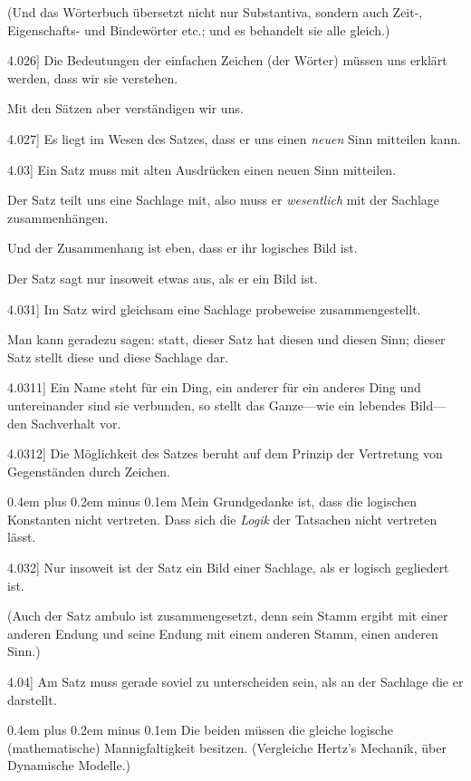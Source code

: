 \documentclass[12pt,oneside]{book}[2007/10/19]
\newcommand{\PropERef}[1]{\hyperref[PropE:#1]{#1}}
\newcommand{\PropositionG}[2]{%
  \item[\phantomsection\label{PropG:#1}\PropERef{#1}] #2%
}
\newcommand{\Emph}[1]{\emph{#1}}%
\newcommand{\stretchyspace}{\spaceskip0.4em plus 0.2em minus 0.1em}
\begin{document}
\begin{propositions}
{(Und das Wörterbuch übersetzt nicht nur
Substantiva, sondern auch \mbox{Zeit-,} Eigenschafts- und
Bindewörter etc.; und es behandelt sie alle gleich.)}


\PropositionG{4.026}
{Die Bedeutungen der einfachen Zeichen (der
Wörter) müssen uns erklärt werden, dass wir sie
verstehen.

Mit den Sätzen aber verständigen wir uns.}


\PropositionG{4.027}
{Es liegt im Wesen des Satzes, dass er uns einen
\Emph{neuen} Sinn mitteilen kann.}


\PropositionG{4.03}
{Ein Satz muss mit alten Ausdrücken einen
neuen Sinn mitteilen.

Der Satz teilt uns eine Sachlage mit, also
muss er \Emph{wesentlich} mit der Sachlage zusammenhängen.

Und der Zusammenhang ist eben, dass er ihr
logisches Bild ist.

Der Satz sagt nur insoweit etwas aus, als er ein
Bild ist.}


\PropositionG{4.031}
{Im Satz wird gleichsam eine Sachlage probeweise
zusammengestellt.

Man kann geradezu sagen: statt, dieser Satz
hat diesen und diesen Sinn; dieser Satz stellt diese
und diese Sachlage dar.}


\PropositionG{4.0311}
{Ein Name steht für ein Ding, ein anderer für
ein anderes Ding und untereinander sind sie
verbunden, so stellt das Ganze---wie ein lebendes
Bild---den Sachverhalt vor.}


\PropositionG{4.0312}
{Die Möglichkeit des Satzes beruht auf dem
Prinzip der Vertretung von Gegenständen durch
Zeichen.

{\stretchyspace
Mein Grundgedanke ist, dass die \glqq{}logischen
Konstanten\grqq{} nicht vertreten. Dass sich die \Emph{Logik}
der Tatsachen nicht vertreten lässt.}}


\PropositionG{4.032}
{Nur insoweit ist der Satz ein Bild einer Sachlage,
als er logisch gegliedert ist.

(Auch der Satz \glqq{}ambulo\grqq{} ist zusammengesetzt,
denn sein Stamm ergibt mit einer anderen Endung
und seine Endung mit einem anderen Stamm, einen
anderen Sinn.)}


\PropositionG{4.04}
{Am Satz muss gerade soviel zu unterscheiden
sein, als an der Sachlage die er darstellt.

{\stretchyspace
Die beiden müssen die gleiche logische (mathematische)
Mannigfaltigkeit besitzen. (Vergleiche
Hertz's Mechanik, über Dynamische Modelle.)}}



\end{propositions}
\end{document}
